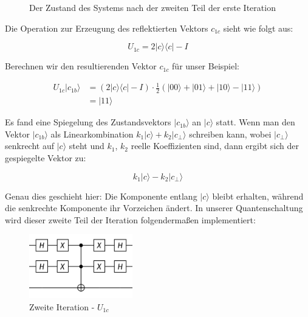 {\begin{figure}[H]
    \caption{Der Zustand des Systems nach der zweiten Teil der erste Iteration}
    \label{fig:after-second-part-grover-three-qubits}
\end{figure}
Die Operation zur Erzeugung des reflektierten Vektors $c_{1c}$ sieht wie folgt aus:

$$
U_{1c} = 2|c\rangle \langle c| - I
$$

Berechnen wir den resultierenden Vektor $c_{1c}$ für unser Beispiel:

\begin{align*}
U_{1c} |c_{1b}\rangle &= \left(2|c\rangle \langle c| - I\right) \cdot \frac{1}{2} (|00\rangle + |01\rangle + |10\rangle - |11\rangle) \\
&= |11\rangle
\end{align*}

Es fand eine Spiegelung des Zustandsvektors $|c_{1b}\rangle$ an $|c\rangle$ statt. Wenn man den Vektor $|c_{1b}\rangle$ als Linearkombination $k_1 |c\rangle + k_2 |c_{\perp}\rangle$ schreiben kann, wobei $|c_{\perp}\rangle$ senkrecht auf $|c\rangle$ steht und $k_1$, $k_2$ reelle Koeffizienten sind, dann ergibt sich der gespiegelte Vektor zu:

$$
k_1 |c\rangle - k_2 |c_{\perp}\rangle
$$

Genau dies geschieht hier: Die Komponente entlang $|c\rangle$ bleibt erhalten, während die senkrechte Komponente ihr Vorzeichen ändert. In unserer Quantenschaltung wird dieser zweite Teil der Iteration folgendermaßen implementiert:

\begin{figure}[h!]
    \centering
    \includegraphics[width=0.4\textwidth]{images/basic-algorithms/grover-2-iteration.png}
    \caption{Zweite Iteration - $U_{1c}$}
    \label{fig:grover-second-iteration}
\end{figure}

}
